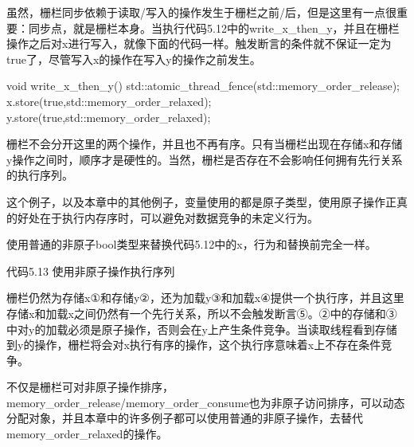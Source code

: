 虽然，栅栏同步依赖于读取/写入的操作发生于栅栏之前/后，但是这里有一点很重要：同步点，就是栅栏本身。当执行代码5.12中的write\_x\_then\_y，并且在栅栏操作之后对x进行写入，就像下面的代码一样。触发断言的条件就不保证一定为true了，尽管写入x的操作在写入y的操作之前发生。

\begin{cpp}
void write_x_then_y()
{
  std::atomic_thread_fence(std::memory_order_release);
  x.store(true,std::memory_order_relaxed);
  y.store(true,std::memory_order_relaxed);
}
\end{cpp}

栅栏不会分开这里的两个操作，并且也不再有序。只有当栅栏出现在存储x和存储y操作之间时，顺序才是硬性的。当然，栅栏是否存在不会影响任何拥有先行关系的执行序列。

这个例子，以及本章中的其他例子，变量使用的都是原子类型，使用原子操作正真的好处在于执行内存序时，可以避免对数据竞争的未定义行为。


使用普通的非原子bool类型来替换代码5.12中的x，行为和替换前完全一样。

代码5.13 使用非原子操作执行序列


栅栏仍然为存储x①和存储y②，还为加载y③和加载x④提供一个执行序，并且这里存储x和加载x之间仍然有一个先行关系，所以不会触发断言⑤。②中的存储和③中对y的加载必须是原子操作，否则会在y上产生条件竞争。当读取线程看到存储到y的操作，栅栏将会对x执行有序的操作，这个执行序意味着x上不存在条件竞争。

不仅是栅栏可对非原子操作排序，memory\_order\_release/memory\_order\_consume也为非原子访问排序，可以动态分配对象，并且本章中的许多例子都可以使用普通的非原子操作，去替代memory\_order\_relaxed的操作。

